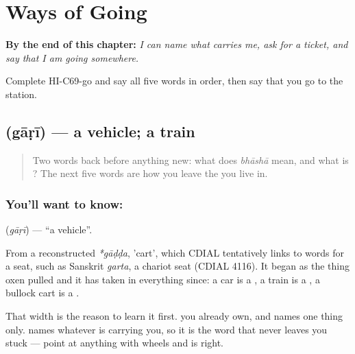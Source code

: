 
\chapter{Ways of Going}
\label{ch:hi-ways-of-going}

\begin{chapteropening}
\textbf{By the end of this chapter:} \emph{I can name what carries me, ask for a ticket, and say that I am going somewhere.}

Complete HI-C69-go and say all five words in order, then say that you go to the station.
\end{chapteropening}

\section[\texorpdfstring{\hi{गाड़ी} (gāṛī)}{गाड़ी (gāṛī)}]{ (gāṛī) — a vehicle; a train}

\label{lesson:HI-C69-vehicle}



\begin{quote}
Two words back before anything new: what does \emph{bhāshā} mean, and what is \textbf{}? The next five words are how you leave the  you live in.
\end{quote}

\subsection*{You'll want to know: }
\textbf{} (\emph{gāṛī}) — \textquotedblleft{}a vehicle\textquotedblright{}.

From a reconstructed \emph{*gāḍḍa}, 'cart', which CDIAL tentatively links to words for a seat, such as Sanskrit \emph{garta}, a chariot seat (CDIAL 4116). It began as the thing oxen pulled and it has taken in everything since: a car is a , a train is a , a bullock cart is a .

That width is the reason to learn it first. \textbf{} you already own, and  names one thing only.  names whatever is carrying you, so it is the word that never leaves you stuck — point at anything with wheels and  is right.

